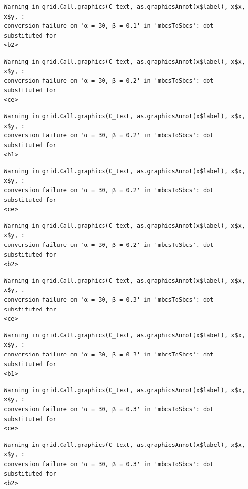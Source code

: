 \documentclass[
  spanish,
  a4paper,
]{scrreport}
\theoremstyle{plain}
\theoremstyle{definition}
\theoremstyle{definition}
\theoremstyle{remark}
\begin{document}
\begin{verbatim}
Warning in grid.Call.graphics(C_text, as.graphicsAnnot(x$label), x$x, x$y, :
conversion failure on 'α = 30, β = 0.1' in 'mbcsToSbcs': dot substituted for
<b2>
\end{verbatim}

\begin{verbatim}
Warning in grid.Call.graphics(C_text, as.graphicsAnnot(x$label), x$x, x$y, :
conversion failure on 'α = 30, β = 0.2' in 'mbcsToSbcs': dot substituted for
<ce>
\end{verbatim}

\begin{verbatim}
Warning in grid.Call.graphics(C_text, as.graphicsAnnot(x$label), x$x, x$y, :
conversion failure on 'α = 30, β = 0.2' in 'mbcsToSbcs': dot substituted for
<b1>
\end{verbatim}

\begin{verbatim}
Warning in grid.Call.graphics(C_text, as.graphicsAnnot(x$label), x$x, x$y, :
conversion failure on 'α = 30, β = 0.2' in 'mbcsToSbcs': dot substituted for
<ce>
\end{verbatim}

\begin{verbatim}
Warning in grid.Call.graphics(C_text, as.graphicsAnnot(x$label), x$x, x$y, :
conversion failure on 'α = 30, β = 0.2' in 'mbcsToSbcs': dot substituted for
<b2>
\end{verbatim}

\begin{verbatim}
Warning in grid.Call.graphics(C_text, as.graphicsAnnot(x$label), x$x, x$y, :
conversion failure on 'α = 30, β = 0.3' in 'mbcsToSbcs': dot substituted for
<ce>
\end{verbatim}

\begin{verbatim}
Warning in grid.Call.graphics(C_text, as.graphicsAnnot(x$label), x$x, x$y, :
conversion failure on 'α = 30, β = 0.3' in 'mbcsToSbcs': dot substituted for
<b1>
\end{verbatim}

\begin{verbatim}
Warning in grid.Call.graphics(C_text, as.graphicsAnnot(x$label), x$x, x$y, :
conversion failure on 'α = 30, β = 0.3' in 'mbcsToSbcs': dot substituted for
<ce>
\end{verbatim}

\begin{verbatim}
Warning in grid.Call.graphics(C_text, as.graphicsAnnot(x$label), x$x, x$y, :
conversion failure on 'α = 30, β = 0.3' in 'mbcsToSbcs': dot substituted for
<b2>
\end{verbatim}
\end{document}
